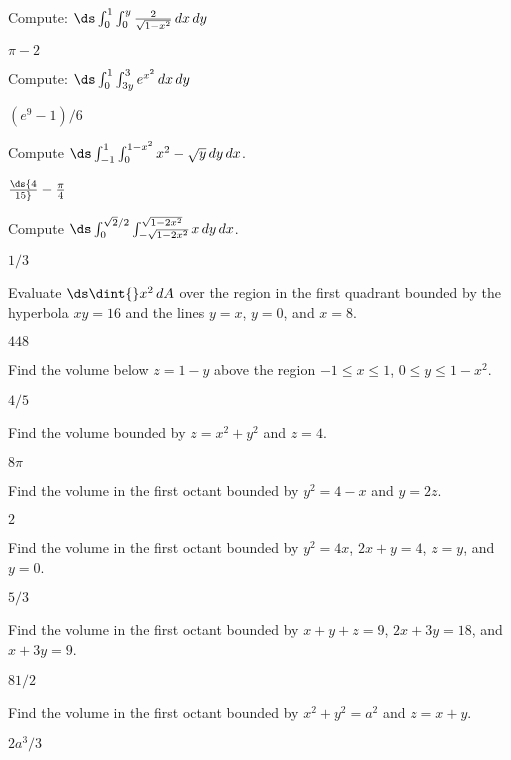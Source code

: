 \begin{exercises}
\exercise Compute: $\ds \int_0^1 \int_0^y
	  {2\over\sqrt{1-x^2}}\,dx\,dy$
\begin{answer} $\pi-2$
\end{answer}

\exercise Compute: $\ds \int_0^1 \int_{3y}^3
	  e^{x^2}\,dx\,dy$
\begin{answer} $(e^9-1)/6$
\end{answer}


\exercise Compute $\ds \int_{-1}^1\int_0^{1-x^2} x^2-\sqrt{y}\,dy\,dx$.
\begin{answer} $\ds {4\over15}-{\pi\over4}$
\end{answer}

\exercise Compute 
$\ds \int_{0}^{\sqrt2/2}\int_{-\sqrt{1-2x^2}}^{\sqrt{1-2x^2}} x\,dy\,dx$.
\begin{answer} $1/3$
\end{answer}


\exercise Evaluate $\ds\dint{} x^2\,dA$ over the region in the first
quadrant bounded by the hyperbola $xy=16$ and the lines $y=x$, $y=0$, and
$x=8$.
\begin{answer} $448$
\end{answer}

\exercise Find the volume below $z=1-y$ above the region
$-1\le x\le 1$, $0\le y\le 1-x^2$.
\begin{answer} $4/5$
\end{answer}

\exercise Find the volume bounded by $z=x^2+y^2$ and $z=4$.
\begin{answer} $8\pi$
\end{answer}


\exercise Find the volume in the first octant
bounded by $y^2=4-x$ and $y=2z$.
\begin{answer} $2$
\end{answer}


\exercise Find the volume in the first octant
bounded by $y^2=4x$, $2x+y=4$, $z=y$,
and $y=0$.
\begin{answer} $5/3$
\end{answer}

\exercise Find the volume in the first octant
bounded by $x+y+z=9$, $2x+3y=18$, and $x+3y=9$.
\begin{answer} $81/2$
\end{answer}

\exercise Find the volume in the first octant
bounded by $x^2+y^2=a^2$ and $z=x+y$.
\begin{answer} $2a^3/3$
\end{answer}


\end{exercises}
